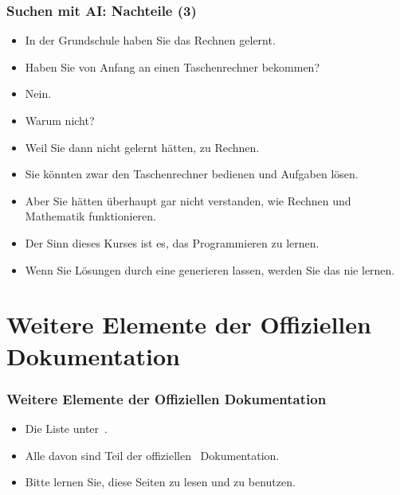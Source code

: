 \documentclass[aspectratio=169,mathserif,notheorems]{beamer}%
\begin{document}
\begin{frame}%
\frametitle{Suchen mit AI: Nachteile (3)}%
\begin{itemize}%
\item In der Grundschule haben Sie das Rechnen gelernt.%
\item<2-> Haben Sie von Anfang an einen Taschenrechner bekommen?%
\item<3-> Nein.%
\item<4-> Warum nicht?%
\item<5-> Weil Sie dann nicht gelernt hätten, zu Rechnen.%
\item<6-> Sie könnten zwar den Taschenrechner bedienen und Aufgaben lösen.%
\item<7-> Aber Sie hätten überhaupt gar nicht verstanden, wie Rechnen und Mathematik funktionieren.%
\item<8-> Der Sinn dieses Kurses ist es, das Programmieren zu lernen.%
\item<9-> Wenn Sie Lösungen durch eine  generieren lassen, werden Sie das nie lernen.%
\end{itemize}%
\end{frame}%
%
\section{Weitere Elemente der Offiziellen Dokumentation}%
%
\begin{frame}[t]%
\frametitle{Weitere Elemente der Offiziellen Dokumentation}%
\begin{itemize}%
%
%
%
%
\item<5-> Die  Liste unter~.%
\item<6-> Alle davon sind Teil der offiziellen \python~Dokumentation.%
\item<7-> Bitte lernen Sie, diese Seiten zu lesen und zu benutzen.%
\end{itemize}%
%
%
%
%
%
\end{frame}%
%
\end{document}
